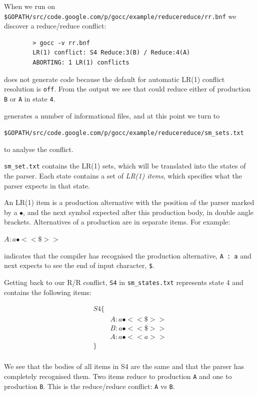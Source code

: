 \documentclass[12pt]{article}
\begin{document}
	When we run \gocc on \verb|$GOPATH/src/code.google.com/p/gocc/example/reducereduce/rr.bnf| we discover a reduce/reduce conflict:

	\begin{verbatim}
		> gocc -v rr.bnf
		LR(1) conflict: S4 Reduce:3(B) / Reduce:4(A)
		ABORTING: 1 LR(1) conflicts
	\end{verbatim}

	\gocc does not generate code because the default for automatic LR(1) conflict resolution is \verb|off|. From the output we see that \gocc could reduce either of production \verb|B| or \verb|A| in state \verb|4|.

	\gocc generates a number of informational files, and at this point we turn to 

	\verb|$GOPATH/src/code.google.com/p/gocc/example/reducereduce/sm_sets.txt|

	to analyse the conflict.

	\verb|sm_set.txt| contains the LR(1) sets, which will be translated into the states of the parser. Each state contains a set of {\em LR(1)  items}, which specifies what the parser expects in that state. 

	An LR(1) item is a production alternative with the position of the parser marked by a $\bullet$, and the next symbol expected after this production body, in double angle brackets. Alternatives of a production are in  separate items. For example: 

	$A : a\bullet <<\$>>$

	indicates that the compiler has recognised the production alternative, \verb|A : a| and  next expects to see the end of input character, \verb|$|.

	Getting back to our R/R conflict, \verb|S4|  in \verb|sm_states.txt| represents state 4 and contains the following items:

	\[
		\begin{array}{ll}
			S4 \{ \\
			    & A : a\bullet  <<\$>> \\
			    & B : a\bullet  <<\$>> \\
			    & A : a\bullet  <<a>> \\
			\} \\
		\end{array}
	\]

	We see that the bodies of all items in S4 are the same and that the parser has completely recognised them. Two items reduce to production \verb|A| and one to production \verb|B|. This is the reduce/reduce conflict: \verb|A| vs \verb|B|.
\end{document}
